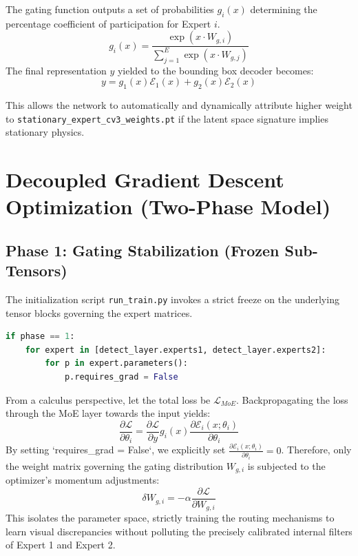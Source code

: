 \documentclass[11pt, letterpaper, oneside, openany]{book}
\begin{document}
The gating function outputs a set of probabilities $g_i(x)$ determining the percentage coefficient of participation for Expert $i$. 
\begin{equation}
    g_i(x) = \frac{\exp(x \cdot W_{g, i})}{\sum_{j=1}^{E} \exp(x \cdot W_{g, j})}
\end{equation}
The final representation $y$ yielded to the bounding box decoder becomes:
\begin{equation}
    y = g_1(x)\mathcal{E}_1(x) + g_2(x)\mathcal{E}_2(x)
\end{equation}

This allows the network to automatically and dynamically attribute higher weight to \texttt{stationary\_expert\_cv3\_weights.pt} if the latent space signature implies stationary physics.

\chapter{Decoupled Gradient Descent Optimization (Two-Phase Model)}

\section{Phase 1: Gating Stabilization (Frozen Sub-Tensors)}
The initialization script \texttt{run\_train.py} invokes a strict freeze on the underlying tensor blocks governing the expert matrices.

\begin{lstlisting}[language=Python, caption=Gradient Decoupling Logic]
if phase == 1:
    for expert in [detect_layer.experts1, detect_layer.experts2]:
        for p in expert.parameters():
            p.requires_grad = False
\end{lstlisting}

From a calculus perspective, let the total loss be $\mathcal{L}_{MoE}$. Backpropagating the loss through the MoE layer towards the input yields:
\begin{equation}
    \frac{\partial \mathcal{L}}{\partial \theta_i} = \frac{\partial \mathcal{L}}{\partial y} g_i(x) \frac{\partial \mathcal{E}_i(x; \theta_i)}{\partial \theta_i}
\end{equation}
By setting `requires_grad = False`, we explicitly set $\frac{\partial \mathcal{E}_i(x; \theta_i)}{\partial \theta_i} = 0$. Therefore, only the weight matrix governing the gating distribution $W_{g,i}$ is subjected to the optimizer's momentum adjustments:
\begin{equation}
    \delta W_{g,i} = -\alpha \frac{\partial \mathcal{L}}{\partial W_{g,i}}
\end{equation}
This isolates the parameter space, strictly training the routing mechanisms to learn visual discrepancies without polluting the precisely calibrated internal filters of Expert 1 and Expert 2.
\end{document}
